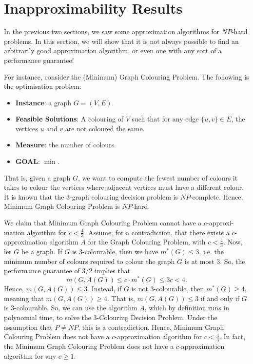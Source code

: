 \documentclass[a4paper, openany]{memoir}
\begin{document}
    \newpage

    \section{Inapproximability Results}
    In the previous two sections, we saw some approximation algorithms for $NP$-hard problems. In this section, we will show that it is not always possible to find an arbitrarily good approximation algorithm, or even one with any sort of a performance guarantee!

    For instance, consider the (Minimum) Graph Colouring Problem. The following is the optimisation problem:
    \begin{itemize}
        \item \textbf{Instance}: a graph $G = (V, E)$.
        \item \textbf{Feasible Solutions}: A colouring of $V$ such that for any edge $\{u, v\} \in E$, the vertices $u$ and $v$ are not coloured the same.
        \item \textbf{Measure}: the number of colours.
        \item \textbf{GOAL}: $\min$.
    \end{itemize}
    That is, given a graph $G$, we want to compute the fewest number of colours it takes to colour the vertices where adjacent vertices must have a different colour. It is known that the $3$-graph colouring decision problem is $NP$-complete. Hence, Minimum Graph Colouring Problem is $NP$-hard.

    We claim that Minimum Graph Colouring Problem cannot have a $c$-approxi-mation algorithm for $c < \frac{4}{3}$. Assume, for a contradiction, that there exists a $c$-approximation algorithm $A$ for the Graph Colouring Problem, with $c < \frac{4}{3}$. Now, let $G$ be a graph. If $G$ is 3-colourable, then we have $m^*(G) \leq 3$, i.e. the minimum number of colours required to colour the graph $G$ is at most $3$. So, the performance guarantee of $3/2$ implies that 
    \[m(G, A(G)) \leq c \cdot m^*(G) \leq 3c < 4.\]
    Hence, $m(G, A(G)) \leq 3$. Instead, if $G$ is not 3-colourable, then $m^*(G) \geq 4$, meaning that $m(G, A(G)) \geq 4$. That is, $m(G, A(G)) \leq 3$ if and only if $G$ is $3$-colourable. So, we can use the algorithm $A$, which by definition runs in polynomial time, to solve the 3-Colouring Decision Problem. Under the assumption that $P \neq NP$, this is a contradiction. Hence, Minimum Graph Colouring Problem does not have a $c$-approximation algorithm for $c < \frac{4}{3}$. In fact, the Minimum Graph Colouring Problem does not have a $c$-approximation algorithm for any $c \geq 1$.
\end{document}
